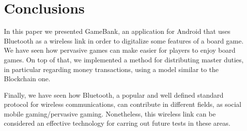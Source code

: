 \section{Conclusions}
\label{conclusions}

In this paper we presented GameBank, an application for Android that uses 
Bluetooth as a wireless link in order to digitalize some features of a board 
game. We have seen how pervasive games can make easier for players to enjoy 
board games. On top of that, we implemented a method for distributing master 
duties, in particular regarding money transactions, using a model similar to 
the Blockchain one.

Finally, we have seen how Bluetooth, a popular and well defined standard 
protocol for wireless communications, can contribute in different fields, as 
social mobile gaming/pervasive gaming. Nonetheless, this wireless link can be 
considered an effective technology for carring out future tests in these areas.